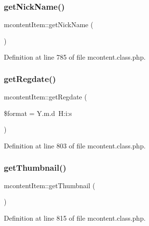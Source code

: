 \subsubsection{\texorpdfstring{get\+Nick\+Name()}{getNickName()}}
{\footnotesize\ttfamily mcontent\+Item\+::get\+Nick\+Name (\begin{DoxyParamCaption}{ }\end{DoxyParamCaption})}



Definition at line 785 of file mcontent.\+class.\+php.

\mbox{\label{classmcontentItem_a0b13a7bf2aff3c032a929559eaf6ddd6}} 
\subsubsection{\texorpdfstring{get\+Regdate()}{getRegdate()}}
{\footnotesize\ttfamily mcontent\+Item\+::get\+Regdate (\begin{DoxyParamCaption}\item[{}]{\$format = {\ttfamily \textquotesingle{}Y.m.d~H\+:i\+:s\textquotesingle{}} }\end{DoxyParamCaption})}



Definition at line 803 of file mcontent.\+class.\+php.

\mbox{\label{classmcontentItem_a25e5c63dceabc33afe0b5ce5b3ddafcf}} 
\subsubsection{\texorpdfstring{get\+Thumbnail()}{getThumbnail()}}
{\footnotesize\ttfamily mcontent\+Item\+::get\+Thumbnail (\begin{DoxyParamCaption}{ }\end{DoxyParamCaption})}



Definition at line 815 of file mcontent.\+class.\+php.

\mbox{\label{classmcontentItem_a180633138fb77537e7da900074aa7454}} 

